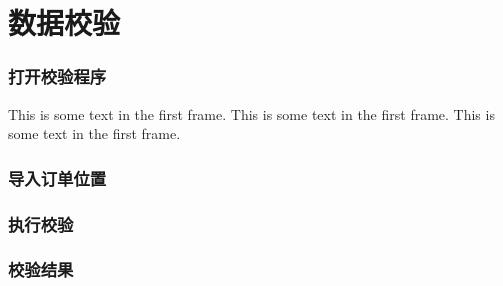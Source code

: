 \section{数据校验}
\begin{frame}
    \frametitle{打开校验程序}
    This is some text in the first frame. This is some text in the first frame. This is some text in the first frame.
\end{frame}
\begin{frame}
    \frametitle{导入订单位置}
\end{frame}
\begin{frame}
    \frametitle{执行校验}
\end{frame}
\begin{frame}
    \frametitle{校验结果}
\end{frame}
